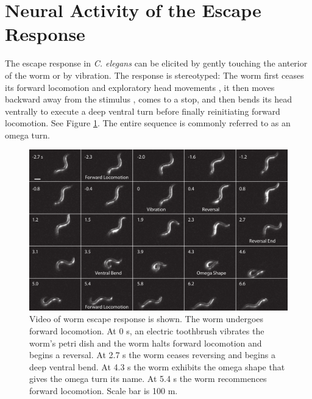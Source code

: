 
\section{Neural Activity of the Escape Response}
The escape response in \textit{C. elegans} can be elicited by gently touching the anterior of the worm or by vibration. The response is  stereotyped: The worm first ceases its forward locomotion and exploratory head movements \citep{alkema_tyramine_2005}, it then moves backward away from the stimulus \citep{chalfie_neural_1985}, comes to a stop, and then bends its head ventrally to execute a deep ventral turn before finally reinitiating forward locomotion.  See Figure \ref{fig:omegaMontage}. The entire sequence is commonly referred to as an omega turn. 

\begin{figure}  %
\includegraphics[width=\textwidth]{figures/omegaMontage}
\caption[Video of worm escape response.]{Video of worm escape response is shown. The worm undergoes forward locomotion.  At 0 s, an electric toothbrush vibrates the worm's petri dish and the worm halts forward locomotion and begins a reversal. At 2.7 s the worm ceases reversing and begins a deep ventral bend. At 4.3 s the worm exhibits the omega shape that gives the omega turn its name. At 5.4 s the worm recommences forward locomotion. Scale bar is 100 \textmu m.
\label{fig:omegaMontage}}
\end{figure}



